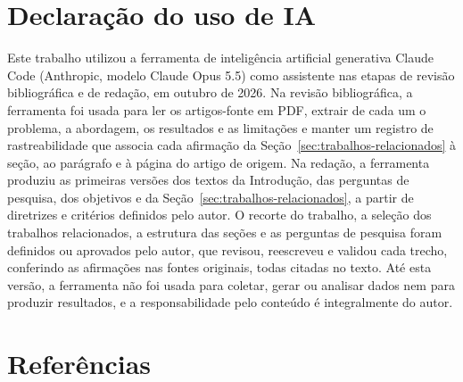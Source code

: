 \documentclass[12pt,a4paper]{article}
\begin{document}
\section*{Declaração do uso de IA}

Este trabalho utilizou a ferramenta de inteligência artificial generativa Claude Code (Anthropic, modelo Claude Opus 5.5) como assistente nas etapas de revisão bibliográfica e de redação, em outubro de 2026. Na revisão bibliográfica, a ferramenta foi usada para ler os artigos-fonte em PDF, extrair de cada um o problema, a abordagem, os resultados e as limitações e manter um registro de rastreabilidade que associa cada afirmação da Seção~\ref{sec:trabalhos-relacionados} à seção, ao parágrafo e à página do artigo de origem. Na redação, a ferramenta produziu as primeiras versões dos textos da Introdução, das perguntas de pesquisa, dos objetivos e da Seção~\ref{sec:trabalhos-relacionados}, a partir de diretrizes e critérios definidos pelo autor. O recorte do trabalho, a seleção dos trabalhos relacionados, a estrutura das seções e as perguntas de pesquisa foram definidos ou aprovados pelo autor, que revisou, reescreveu e validou cada trecho, conferindo as afirmações nas fontes originais, todas citadas no texto. Até esta versão, a ferramenta não foi usada para coletar, gerar ou analisar dados nem para produzir resultados, e a responsabilidade pelo conteúdo é integralmente do
autor.

\section*{Referências}

\printbibliography[heading=none]
\end{document}

